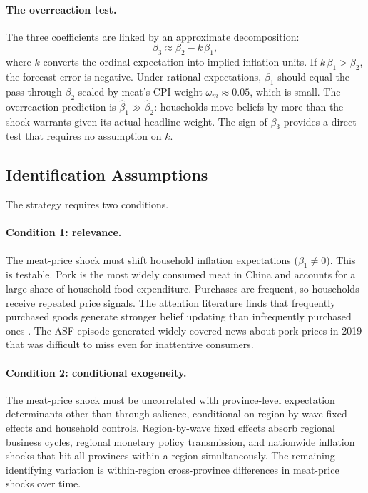 \paragraph{The overreaction test.}
The three coefficients are linked by an approximate decomposition:
\begin{equation}\label{eq:decomp_strategy}
  \beta_3 \approx \beta_2 - k\,\beta_1,
\end{equation}
where $k$ converts the ordinal expectation into implied inflation
units.
If $k\,\beta_1 > \beta_2$, the forecast error is negative.
Under rational expectations, $\beta_1$ should equal the
pass-through $\beta_2$ scaled by meat's CPI weight
$\omega_m \approx 0.05$, which is small.
The overreaction prediction is $\hat{\beta}_1 \gg \hat{\beta}_2$:
households move beliefs by more than the shock warrants given its
actual headline weight.
The sign of $\beta_3$ provides a direct test that requires no
assumption on $k$.

\subsection{Identification Assumptions}
\label{sec:identification_assumptions}

The strategy requires two conditions.

\paragraph{Condition 1: relevance.}
The meat-price shock must shift household inflation expectations
($\beta_1 \neq 0$).
This is testable.
Pork is the most widely consumed meat in China and accounts for a
large share of household food expenditure.
Purchases are frequent, so households receive repeated price signals.
The attention literature finds that frequently purchased goods
generate stronger belief updating than infrequently purchased ones
\citep{Cavallo2017, Gorodnichenko2015}.
The ASF episode generated widely covered news about pork prices in
2019 that was difficult to miss even for inattentive consumers.

\paragraph{Condition 2: conditional exogeneity.}
The meat-price shock must be uncorrelated with province-level
expectation determinants other than through salience, conditional
on region-by-wave fixed effects and household controls.
Region-by-wave fixed effects absorb regional business cycles,
regional monetary policy transmission, and nationwide inflation
shocks that hit all provinces within a region simultaneously.
The remaining identifying variation is within-region cross-province
differences in meat-price shocks over time.

